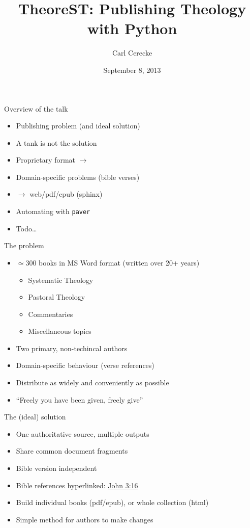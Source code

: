\documentclass{beamer}
\title{TheoreST: Publishing Theology with Python}
\author{Carl Cerecke}
\institute{Evangelical Bible College of Western Australia}
\date{September 8, 2013}
\begin{document}
    \begin{frame}[plain]
        \titlepage
    \end{frame}

\begin{frame}{Overview of the talk}
    \begin{itemize}
    \item Publishing problem (and ideal solution)
    \item A tank is not the solution
    \item Proprietary format $\rightarrow$ \rst
    \item Domain-specific problems (bible verses)
    \item \rst $\rightarrow$ web/pdf/epub (sphinx)
    \item Automating with \texttt{paver}
    \item Todo\ldots
    \end{itemize}
\end{frame}
    
\begin{frame}{The problem}
    \begin{itemize}
    \item $\simeq$300 books in MS Word format (written over 20+ years)
        \begin{itemize}
        \item Systematic Theology
        \item Pastoral Theology
        \item Commentaries
        \item Miscellaneous topics 
        \end{itemize}
    \item Two primary, non-techincal authors
    \item Domain-specific behaviour (verse references)
    \item Distribute as widely and conveniently as possible
    \item ``Freely you have been given, freely give''
    \end{itemize}
\end{frame}
    
\begin{frame}{The (ideal) solution}
\begin{itemize}
    \item One authoritative source, multiple outputs
    \item Share common document fragments
    \item Bible version independent
    \item Bible references hyperlinked: \href{http://some.url}{John 3:16}
    \item Build individual books (pdf/epub), or whole collection (html)
    \item Simple method for authors to make changes
\end{itemize}
\end{frame}
\end{document}
